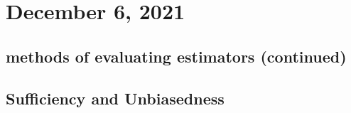 \section{December 6, 2021}
\subsection{methods of evaluating estimators (continued)}

\subsection{Sufficiency and Unbiasedness}